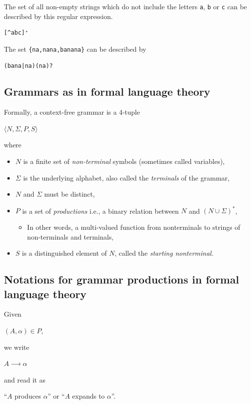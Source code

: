 \documentclass[11pt]{article}
\theoremstyle{definition}
\begin{document}
The set of all non-empty strings which do not include
the letters \texttt{a}, \texttt{b} or \texttt{c} can be described by this regular expression.
\begin{verbatim}
[^abc]⁺
\end{verbatim}

The set \texttt{\{na,nana,banana\}} can be described by
\begin{verbatim}
(bana|na)(na)?
\end{verbatim}

\subsection{Grammars as in formal language theory}
\label{sec:org775a78d}
Formally, a context-free grammar is a 4-tuple
\begin{center}
\(⟨N, Σ, P, S⟩\)
\end{center}
where
\begin{itemize}
\item \(N\) is a finite set of \emph{non-terminal} symbols
(sometimes called variables),
\item \(Σ\) is the underlying alphabet,
also called the \emph{terminals} of the grammar,
\item \(N\) and \(Σ\) must be distinct,
\item \(P\) is a set of \emph{productions} i.e.,
a binary relation between \(N\) and \((N ∪ Σ)^{*}\),
\begin{itemize}
\item In other words, a multi-valued function from
nonterminals to strings of non-terminals and terminals,
\end{itemize}
\item \(S\) is a distinguished element of \(N\), called the \emph{starting nonterminal}.
\end{itemize}

\subsection{Notations for grammar productions in formal language theory}
\label{sec:org8145865}
Given
\begin{center}
\((A, α) ∈ P\),
\end{center}
we write
\begin{center}
\(A ⟶ α\)
\end{center}
and read it as
\begin{center}
“\(A\) produces \(α\)” or “\(A\) expands to \(α\)”.
\end{center}
\end{document}

